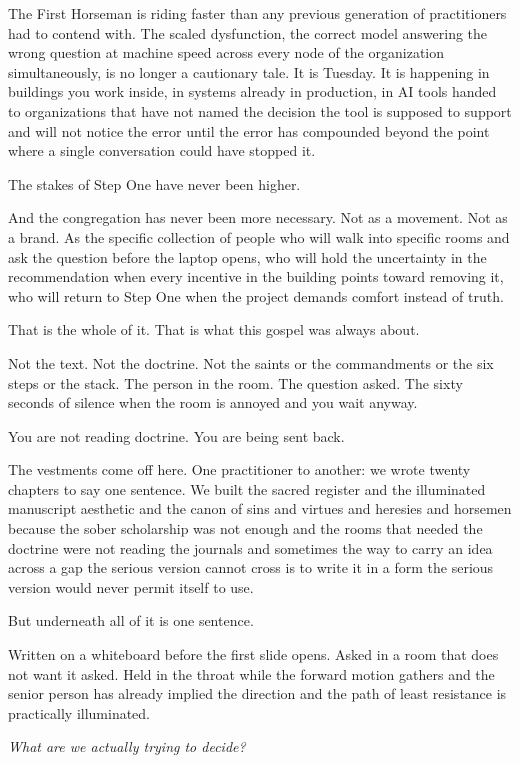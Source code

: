 The First Horseman is riding faster than any previous generation of practitioners had to contend with. The scaled dysfunction, the correct model answering the wrong question at machine speed across every node of the organization simultaneously, is no longer a cautionary tale. It is Tuesday. It is happening in buildings you work inside, in systems already in production, in AI tools handed to organizations that have not named the decision the tool is supposed to support and will not notice the error until the error has compounded beyond the point where a single conversation could have stopped it.

The stakes of Step One have never been higher.

And the congregation has never been more necessary. Not as a movement. Not as a brand. As the specific collection of people who will walk into specific rooms and ask the question before the laptop opens, who will hold the uncertainty in the recommendation when every incentive in the building points toward removing it, who will return to Step One when the project demands comfort instead of truth.

That is the whole of it. That is what this gospel was always about.

Not the text. Not the doctrine. Not the saints or the commandments or the six steps or the stack. The person in the room. The question asked. The sixty seconds of silence when the room is annoyed and you wait anyway.

You are not reading doctrine. You are being sent back.

The vestments come off here. One practitioner to another: we wrote twenty chapters to say one sentence. We built the sacred register and the illuminated manuscript aesthetic and the canon of sins and virtues and heresies and horsemen because the sober scholarship was not enough and the rooms that needed the doctrine were not reading the journals and sometimes the way to carry an idea across a gap the serious version cannot cross is to write it in a form the serious version would never permit itself to use.

But underneath all of it is one sentence.

Written on a whiteboard before the first slide opens. Asked in a room that does not want it asked. Held in the throat while the forward motion gathers and the senior person has already implied the direction and the path of least resistance is practically illuminated.

\vspace{1.5em}
\begin{center}
  \itshape What are we actually trying to decide?
\end{center}
\vspace{0.5em}

